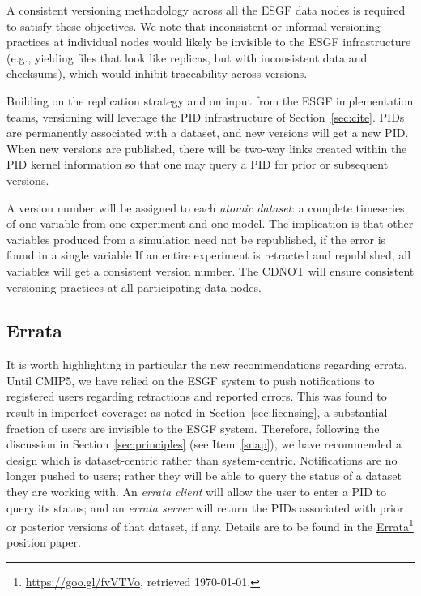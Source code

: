 \documentclass[gmd,manuscript]{copernicus}
\newcommand{\urlref}[2] {\href{#1}{#2}\footnote{\url{#1}, retrieved \today.}}
\begin{document}
A consistent versioning methodology across all the ESGF data nodes is
required to satisfy these objectives. We note that inconsistent or
informal versioning practices at individual nodes would likely be
invisible to the ESGF infrastructure (e.g., yielding files that look
like replicas, but with inconsistent data and checksums), which would
inhibit traceability across versions.

Building on the replication strategy and on input from
the ESGF implementation teams, versioning will leverage the PID
infrastructure of Section~\ref{sec:cite}. PIDs are permanently
associated with a dataset, and new versions will get a new PID. When
new versions are published, there will be two-way links created within
the PID kernel information so that one may query a PID for prior or
subsequent versions.

A version number will be assigned to each \emph{atomic dataset}: a complete
timeseries of one variable from one experiment and one model. The
implication is that other variables produced from a simulation need not be republished, if the
error is found in a single variable If an entire experiment is
retracted and republished, all variables will get a consistent version
number. The CDNOT will ensure consistent versioning practices at all
participating data nodes.

\subsection{Errata}
\label{sec:errata}

It is worth highlighting in particular the new recommendations
regarding errata. Until CMIP5, we have relied on the ESGF system to
push notifications to registered users regarding retractions and
reported errors. This was found to result in imperfect coverage: as
noted in Section~\ref{sec:licensing}, a substantial fraction of users
are invisible to the ESGF system. Therefore, following the discussion
in Section~\ref{sec:principles} (see Item~\ref{snap}), we have
recommended a design which is dataset-centric rather than
system-centric. Notifications are no longer pushed to users; rather
they will be able to query the status of a dataset they are working
with. An \emph{errata client} will allow the user to enter a PID to
query its status; and an \emph{errata server} will return the PIDs
associated with prior or posterior versions of that dataset, if any.
Details are to be found in the \urlref{https://goo.gl/fvVTVo}{Errata}
position paper.
\end{document}

